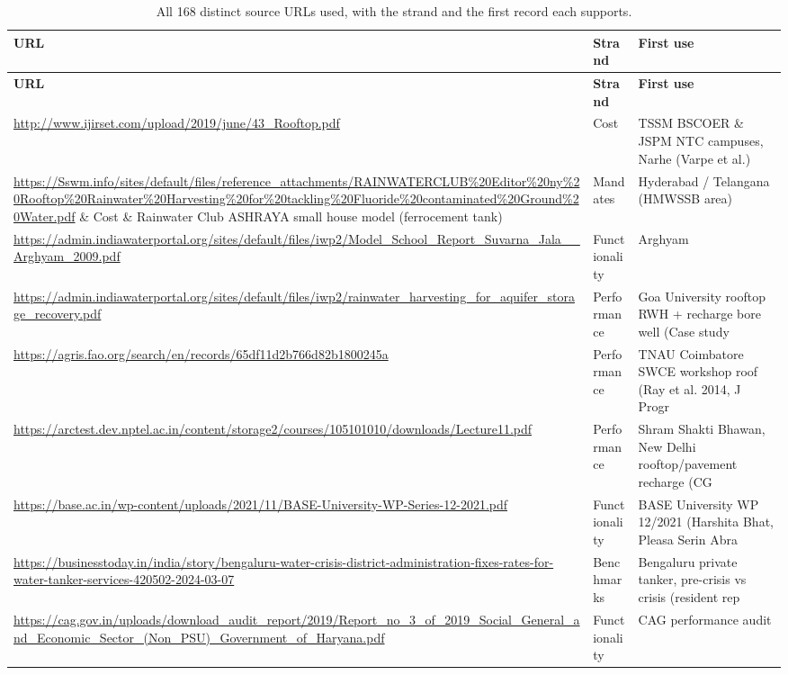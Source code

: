 {\tiny\setlength{\tabcolsep}{3pt}
\begin{longtable}{p{9.2cm} p{2.5cm} p{4.2cm}}
\caption{All 168 distinct source URLs used, with the strand and the first record each supports.}\label{tab:sources}\\
\toprule
\textbf{URL} & \textbf{Strand} & \textbf{First use}\\ \midrule\endfirsthead
\toprule \textbf{URL} & \textbf{Strand} & \textbf{First use}\\ \midrule\endhead
\bottomrule\endfoot
\url{http://www.ijirset.com/upload/2019/june/43_Rooftop.pdf} & Cost & TSSM BSCOER \& JSPM NTC campuses, Narhe (Varpe et al.)\\
\url{https://Sswm.info/sites/default/files/reference_attachments/RAINWATERCLUB%20Editor%20ny%20Rooftop%20Rainwater%20Harvesting%20for%20tackling%20Fluoride%20contaminated%20Ground%20Water.pdf} & Cost & Rainwater Club ASHRAYA small house model (ferrocement tank)\\
\url{https://admin.indiawaterportal.org/articles/rainwater-harvesting-made-mandatory-andhra-pradesh-all-municipal-corporations-and-urban} & Mandates & Hyderabad / Telangana (HMWSSB area)\\
\url{https://admin.indiawaterportal.org/sites/default/files/iwp2/Model_School_Report_Suvarna_Jala__Arghyam_2009.pdf} & Functionality & Arghyam\\
\url{https://admin.indiawaterportal.org/sites/default/files/iwp2/rainwater_harvesting_for_aquifer_storage_recovery.pdf} & Performance & Goa University rooftop RWH + recharge bore well (Case study \\
\url{https://agris.fao.org/search/en/records/65df11d2b766d82b1800245a} & Performance & TNAU Coimbatore SWCE workshop roof (Ray et al. 2014, J Progr\\
\url{https://arctest.dev.nptel.ac.in/content/storage2/courses/105101010/downloads/Lecture11.pdf} & Performance & Shram Shakti Bhawan, New Delhi rooftop/pavement recharge (CG\\
\url{https://base.ac.in/wp-content/uploads/2021/11/BASE-University-WP-Series-12-2021.pdf} & Functionality & BASE University WP 12/2021 (Harshita Bhat, Pleasa Serin Abra\\
\url{https://businesstoday.in/india/story/bengaluru-water-crisis-district-administration-fixes-rates-for-water-tanker-services-420502-2024-03-07} & Benchmarks & Bengaluru private tanker, pre-crisis vs crisis (resident rep\\
\url{https://cag.gov.in/uploads/download_audit_report/2019/Report_no_3_of_2019_Social_General_and_Economic_Sector_(Non_PSU)_Government_of_Haryana.pdf} & Functionality & CAG performance audit\\

\end{longtable}}
